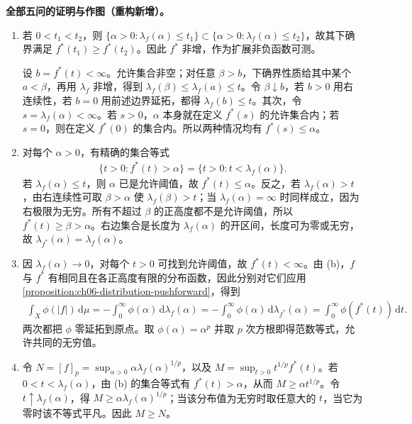 \documentclass[../../main.tex]{subfiles}
\begin{document}
\begin{solution}
\textbf{全部五问的证明与作图（重构新增）。}
\begin{enumerate}
\item 若 $0<t_1<t_2$，则 $\{\alpha>0:\lambda_f(\alpha)\leqslant t_1\}\subset\{\alpha>0:\lambda_f(\alpha)\leqslant t_2\}$，故其下确界满足 $f^*(t_1)\geqslant f^*(t_2)$。因此 $f^*$ 非增，作为扩展非负函数可测。

设 $b=f^*(t)<\infty$。允许集合非空；对任意 $\beta>b$，下确界性质给其中某个 $a<\beta$，再用 $\lambda_f$ 非增，得到 $\lambda_f(\beta)\leqslant\lambda_f(a)\leqslant t$。令 $\beta\downarrow b$，若 $b>0$ 用右连续性，若 $b=0$ 用前述边界延拓，都得 $\lambda_f(b)\leqslant t$。其次，令 $s=\lambda_f(\alpha)<\infty$。若 $s>0$，$\alpha$ 本身就在定义 $f^*(s)$ 的允许集合内；若 $s=0$，则在定义 $f^*(0)$ 的集合内。所以两种情况均有 $f^*(s)\leqslant\alpha$。
\item 对每个 $\alpha>0$，有精确的集合等式
\begin{align*}
\{t>0:f^*(t)>\alpha\}=\{t>0:t<\lambda_f(\alpha)\}.
\end{align*}
若 $\lambda_f(\alpha)\leqslant t$，则 $\alpha$ 已是允许阈值，故 $f^*(t)\leqslant\alpha$。反之，若 $\lambda_f(\alpha)>t$，由右连续性可取 $\beta>\alpha$ 使 $\lambda_f(\beta)>t$；当 $\lambda_f(\alpha)=\infty$ 时同样成立，因为右极限为无穷。所有不超过 $\beta$ 的正高度都不是允许阈值，所以 $f^*(t)\geqslant\beta>\alpha$。右边集合是长度为 $\lambda_f(\alpha)$ 的开区间，长度可为零或无穷，故 $\lambda_{f^*}(\alpha)=\lambda_f(\alpha)$。
\item 因 $\lambda_f(\alpha)\to0$，对每个 $t>0$ 可找到允许阈值，故 $f^*(t)<\infty$。由 (b)，$f$ 与 $f^*$ 有相同且在各正高度有限的分布函数，因此分别对它们应用\cref{proposition:ch06-distribution-pushforward}，得到
\begin{align*}
\int_X\phi(|f|)\,\mathrm d\mu
=-\int_0^\infty\phi(\alpha)\,\mathrm d\lambda_f(\alpha)
=-\int_0^\infty\phi(\alpha)\,\mathrm d\lambda_{f^*}(\alpha)
=\int_0^\infty\phi(f^*(t))\,\mathrm dt.
\end{align*}
两次都把 $\phi$ 零延拓到原点。取 $\phi(\alpha)=\alpha^p$ 并取 $p$ 次方根即得范数等式，允许共同的无穷值。
\item 令 $N=[f]_p=\sup_{\alpha>0}\alpha\lambda_f(\alpha)^{1/p}$，以及 $M=\sup_{t>0}t^{1/p}f^*(t)$。若 $0<t<\lambda_f(\alpha)$，由 (b) 的集合等式有 $f^*(t)>\alpha$，从而 $M\geqslant\alpha t^{1/p}$。令 $t\uparrow\lambda_f(\alpha)$，得 $M\geqslant\alpha\lambda_f(\alpha)^{1/p}$；当该分布值为无穷时取任意大的 $t$，当它为零时该不等式平凡。因此 $M\geqslant N$。


\end{enumerate}
\end{solution}
\end{document}
